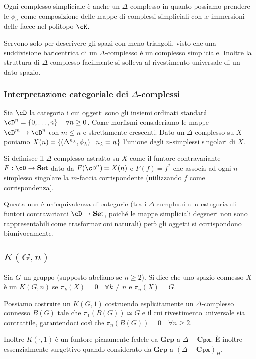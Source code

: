 \documentclass[a4paper,NoNotes,GeneralMath]{stdmdoc}
\newcommand{\Grp}{\textbf{Grp}}
\newcommand{\Set}{\textbf{Set}}
\newcommand{\Cpx}{\textbf{Cpx}}
\begin{document}
Ogni complesso simpliciale è anche un $\Delta$-complesso in quanto possiamo prendere le $\phi_\sigma$ come composizione delle mappe di complessi simpliciali con le immersioni delle facce nel politopo $\cK$.

Servono solo per descrivere gli spazi con meno triangoli, visto che una suddivisione baricentrica di un $\Delta$-complesso è un complesso simpliciale.
Inoltre la struttura di $\Delta$-complesso facilmente si solleva al rivestimento universale di un dato spazio.

\subsubsection*{Interpretazione categoriale dei $\Delta$-complessi}
Sia $\cD$ la categoria i cui oggetti sono gli insiemi ordinati standard $\cD^n = \lrg{0, \ldots, n} \quad \forall n \ge 0$.
Come morfismi consideriamo le mappe $\cD^m \rar \cD^n$ con $m \le n$ e strettamente crescenti.
Dato un $\Delta$-complesso su $X$ poniamo $X(n) = \left\{{(\Delta^{n_\lambda}, \phi_\lambda) \mid n_\lambda = n}\right\}$ l'unione degli $n$-simplessi singolari di $X$.

Si definisce il $\Delta$-complesso astratto su $X$ come il funtore contravariante $F: \cD \rar \Set$ dato da $F(\cD^n) = X(n)$ e $F(f) = f^*$ che associa ad ogni $n$-simplesso singolare la $m$-faccia corrispondente (utilizzando $f$ come corrispondenza).

Questa non è un'equivalenza di categorie (tra i $\Delta$-complessi e la categoria di funtori contravarianti $\cD \rar \Set$, poiché le mappe simpliciali degeneri non sono rappresentabili come trasformazioni naturali) però gli oggetti si corrispondono biunivocamente.

\subsection*{$K(G, n)$}
Sia $G$ un gruppo (supposto abeliano se $n \ge 2$). Si dice che uno spazio connesso $X$ è un $K(G, n)$ se $\pi_k(X) = 0 \quad \forall k \neq n$ e $\pi_n(X) = G$.

Possiamo costruire un $K(G, 1)$ costruendo esplicitamente un $\Delta$-complesso connesso $B(G)$ tale che $\pi_1(B(G)) \simeq G$ e il cui rivestimento universale sia contrattile, garantendoci così che $\pi_n(B(G)) = 0 \quad \forall n \ge 2$.

Inoltre $K(\cdot, 1)$ è un funtore pienamente fedele da $\Grp$ a $\Delta-\Cpx$.
È inoltre essenzialmente surgettivo quando considerato da $\Grp$ a $(\Delta-\Cpx)_H$.
\end{document}
